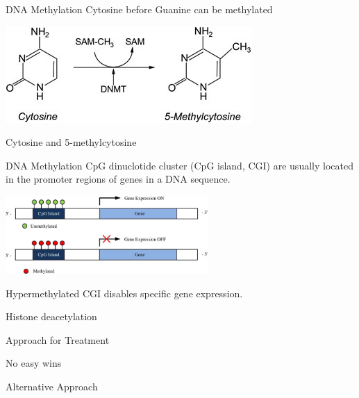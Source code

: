 \documentclass{beamer}
\begin{document}
    \begin{frame}{DNA Methylation}
        Cytosine before Guanine can be methylated

        \begin{center}
            \includegraphics{5mc.png}

            \small Cytosine and 5-methylcytosine
        \end{center}
    \end{frame}

    \begin{frame}{DNA Methylation}
        CpG dinuclotide cluster (CpG island, CGI) are usually located in the promoter regions of genes in a DNA sequence.
        \begin{center}
            \includegraphics[height=8em]{1}
        \end{center}
        Hypermethylated CGI disables specific gene expression.
    \end{frame}

    \begin{frame}{Histone deacetylation}

    \end{frame}

    \begin{frame}{Approach for Treatment}

    \end{frame}

    \begin{frame}{No easy wins}

    \end{frame}

    \begin{frame}{Alternative Approach}

    \end{frame}
\end{document}
